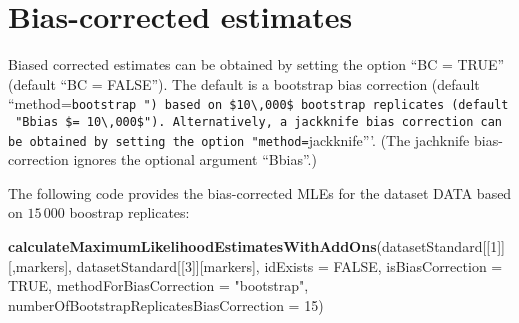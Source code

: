 \documentclass[
]{article}
\newenvironment{Shaded}{\begin{snugshade}}{\end{snugshade}}
\newcommand{\AttributeTok}[1]{\textcolor[rgb]{0.13,0.29,0.53}{#1}}
\newcommand{\ConstantTok}[1]{\textcolor[rgb]{0.56,0.35,0.01}{#1}}
\newcommand{\DecValTok}[1]{\textcolor[rgb]{0.00,0.00,0.81}{#1}}
\newcommand{\FunctionTok}[1]{\textcolor[rgb]{0.13,0.29,0.53}{\textbf{#1}}}
\newcommand{\NormalTok}[1]{#1}
\newcommand{\StringTok}[1]{\textcolor[rgb]{0.31,0.60,0.02}{#1}}
\begin{document}
\section*{Bias-corrected estimates}

Biased corrected estimates can be obtained by setting the option ``BC =
TRUE'' (default ``BC = FALSE''). The default is a bootstrap bias
correction (default
``method=\texttt{bootstrap\textquotesingle{}\ ")\ based\ on\ \$10\textbackslash{},000\$\ bootstrap\ replicates\ (default\ "Bbias\ \$=\ 10\textbackslash{},000\$").\ Alternatively,\ a\ jackknife\ bias\ correction\ can\ be\ obtained\ by\ setting\ the\ option\ "method=}jackknife'''.
(The jachknife bias-correction ignores the optional argument ``Bbias''.)

The following code provides the bias-corrected MLEs for the dataset DATA
based on \(15\,000\) boostrap replicates:

\begin{Shaded}
\begin{Highlighting}[]
\FunctionTok{calculateMaximumLikelihoodEstimatesWithAddOns}\NormalTok{(datasetStandard[[}\DecValTok{1}\NormalTok{]][,markers], datasetStandard[[}\DecValTok{3}\NormalTok{]][markers], }\AttributeTok{idExists =} \ConstantTok{FALSE}\NormalTok{, }\AttributeTok{isBiasCorrection =} \ConstantTok{TRUE}\NormalTok{, }\AttributeTok{methodForBiasCorrection =} \StringTok{"bootstrap"}\NormalTok{, }\AttributeTok{numberOfBootstrapReplicatesBiasCorrection =} \DecValTok{15}\NormalTok{)}
\end{Highlighting}
\end{Shaded}
\end{document}
